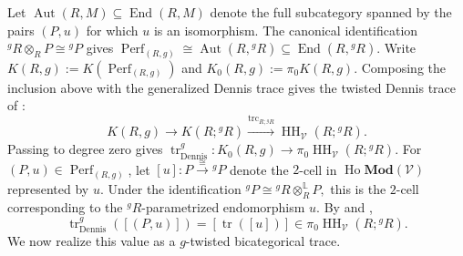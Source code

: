 \documentclass[11pt,oneside]{amsart}
\DeclareMathOperator{\Ho}{Ho}
\DeclareMathOperator{\HH}{HH}
\DeclareMathOperator{\Perf}{Perf}
\DeclareMathOperator{\End}{End}
\DeclareMathOperator{\Aut}{Aut}
\numberwithin{equation}{section}
\numberwithin{figure}{section}
\theoremstyle{plain}
\theoremstyle{definition}
\theoremstyle{remark}
\begin{document}
Let 
\(
\Aut(R,M)\subseteq\End(R,M)
\)
denote the full subcategory spanned by the pairs $(P,u)$ for which $u$ is an isomorphism. The canonical identification 
\(
{}^gR\otimes_R P\cong{}^gP
\)
gives 
\(
\Perf_{(R,g)}
\cong
\Aut(R,{}^gR)
\subseteq
\End(R,{}^gR).
\)
Write 
\(
K(R,g) := K(\Perf_{(R,g)})\) and \(
K_0(R,g) := \pi_0K(R,g).
\)
Composing the inclusion above with the generalized Dennis trace gives the twisted Dennis trace of \cite[Theorem~6.1.1]{AGHKK}:
\[
K(R,g)
\longrightarrow
K(R;{}^gR)
\xrightarrow{\operatorname{trc}_{R;{}^gR}}
\HH_{\mathcal V}(R;{}^gR).
\]
Passing to degree zero gives 
\(
\operatorname{tr}_{\mathrm{Dennis}}^g\colon
K_0(R,g)
\to
\pi_0\HH_{\mathcal V}(R;{}^gR).
\)
For $(P,u)\in\Perf_{(R,g)}$, let 
\(
[u]\colon P\xrightarrow{\cong}{}^gP
\)
denote the $2$-cell in $\Ho\mathbf{Mod}(\mathcal V)$ represented by $u$. Under the identification 
\(
{}^gP
\cong
{}^gR\otimes_R^{\mathbb L}P,
\)
this is the $2$-cell corresponding to the ${}^gR$-parametrized endomorphism $u$. By \cite[Remark~6.1.3]{AGHKK} and \cite[Example~6.26]{CLMPI},
\[
\operatorname{tr}_{\mathrm{Dennis}}^g([(P,u)])
= [\operatorname{tr}([u])]
\in
\pi_0\HH_{\mathcal V}(R;{}^gR).
\]
We now realize this value as a $g$-twisted bicategorical trace.
\end{document}
